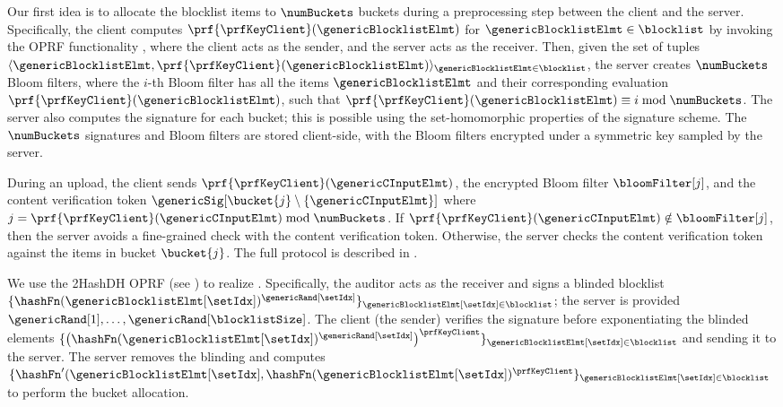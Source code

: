 Our first idea is to allocate the blocklist items to $\numBuckets$ buckets during a preprocessing step between the client and the server. 
Specifically, the client computes $\prf{\prfKeyClient}(\genericBlocklistElmt)$ for $\genericBlocklistElmt \in \blocklist$ by invoking the OPRF functionality \oprfFunc, where the client acts as the sender, and the server acts as the receiver. Then, given the set of tuples $\langle \genericBlocklistElmt, \prf{\prfKeyClient}(\genericBlocklistElmt) \rangle_{\genericBlocklistElmt \in \blocklist}$, the server creates $\numBuckets$ Bloom filters, where the $i$-th Bloom filter has all the items $\genericBlocklistElmt$ and their corresponding evaluation $\prf{\prfKeyClient}(\genericBlocklistElmt)$, such that $\prf{\prfKeyClient}(\genericBlocklistElmt)  \equiv i \bmod \numBuckets$. The server also computes the signature for each bucket; this is possible using the set-homomorphic properties of the signature scheme. 
The $\numBuckets$ signatures and Bloom filters are stored client-side, with the Bloom filters encrypted under a symmetric key sampled by the server. 



During an upload, the client sends $\prf{\prfKeyClient}(\genericCInputElmt)$, the encrypted Bloom filter $\bloomFilter[j]$, and the content verification token $\genericSig[\bucket{j} \setminus \{\genericCInputElmt\}]$ where $j = \prf{\prfKeyClient}(\genericCInputElmt) \bmod \numBuckets$. 
If $\prf{\prfKeyClient}(\genericCInputElmt) \notin \bloomFilter[j]$, then the server avoids a fine-grained check with the content verification token. Otherwise, the server  checks the content verification token against the items in bucket $\bucket{j}$. The full protocol \protocolEMP is described in .

We use the 2HashDH OPRF (see ) to realize \oprfFunc. Specifically, the auditor acts as the receiver and signs a blinded blocklist $\{ \hashFn(\genericBlocklistElmt[\setIdx])^{\genericRand[\setIdx]}\}_{\genericBlocklistElmt[\setIdx] \in \blocklist}$; the server is provided $\genericRand[1], \dots, \genericRand[\blocklistSize]$. The client (the sender) verifies the signature before exponentiating the blinded elements $\{ \left(\hashFn(\genericBlocklistElmt[\setIdx])^{\genericRand[\setIdx]}\right)^{\prfKeyClient}\}_{\genericBlocklistElmt[\setIdx] \in \blocklist}$ and sending it to the server. The server removes the blinding and computes $\{ \hashFn'(\genericBlocklistElmt[\setIdx], \hashFn(\genericBlocklistElmt[\setIdx])^{\prfKeyClient}\}_{\genericBlocklistElmt[\setIdx] \in \blocklist}$ to perform the bucket allocation.


